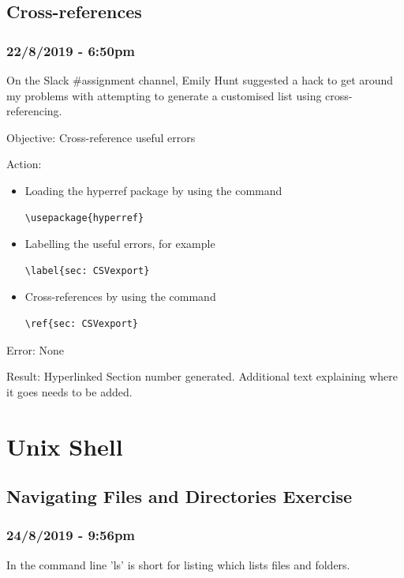 \documentclass{article}
\begin{document}
\subsection{Cross-references}
\subsubsection*{22/8/2019 - 6:50pm}
On the Slack \#assignment channel, Emily Hunt suggested a hack to get around my problems with attempting to generate a customised list using cross-referencing.\par
Objective: Cross-reference useful errors\par
Action:
\begin{itemize}
\item Loading the hyperref package by using the command \begin{verbatim}\usepackage{hyperref}\end{verbatim}
\item Labelling the useful errors, for example 
\begin{verbatim}\label{sec: CSVexport}\end{verbatim}
\item Cross-references by using the command \begin{verbatim}\ref{sec: CSVexport}\end{verbatim}
\end{itemize}

Error: None\par
Result: Hyperlinked Section number generated. Additional text explaining where it goes needs to be added.
\section{Unix Shell}
\subsection{Navigating Files and Directories Exercise}
\subsubsection*{24/8/2019 - 9:56pm}

In the command line 'ls' is short for listing which lists files and folders.\par
\end{document}
